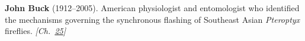 \textbf{John Buck} (1912–2005). American physiologist and entomologist who identified the mechanisms governing the synchronous flashing of Southeast Asian \emph{Pteroptyx} fireflies. \emph{[Ch.~\hyperref[ch:fireflybioluminescence]{25}]}

